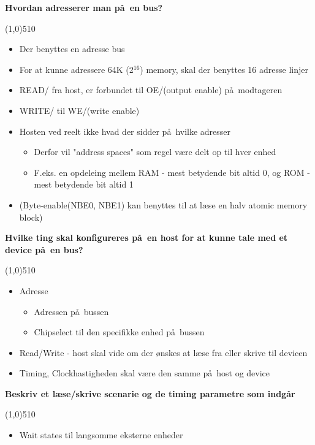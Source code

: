 \documentclass{paper}
\begin{document}
\begin{large}\textbf{Hvordan adresserer man p\aa\ en bus?}\end{large}

\line(1,0){510}
\begin{itemize}
	\item Der benyttes en adresse bus
	\item For at kunne adressere 64K (2$^{16}$) memory, skal der benyttes 16 adresse linjer  
	\item READ/ fra host, er forbundet til OE/(output enable) p\aa\ modtageren
	\item WRITE/ til WE/(write enable)
	\item Hosten ved reelt ikke hvad der sidder p\aa\ hvilke adresser
	\begin{itemize}
		\item Derfor vil "address spaces" som regel v\ae re delt op til hver enhed
		\item F.eks. en opdeleing mellem RAM - mest betydende bit altid 0, og ROM - mest betydende bit altid 1
	\end{itemize}
	\item (Byte-enable(NBE0, NBE1) kan benyttes til at l\ae se en halv atomic memory block) 
\end{itemize}

\begin{large}\textbf{Hvilke ting skal konfigureres p\aa\ en host for at kunne tale med et device p\aa\ en bus?}\end{large}

\line(1,0){510}
\begin{itemize}
	\item Adresse
	\begin{itemize}
		\item Adressen p\aa\ bussen
		\item Chipselect til den specifikke enhed p\aa\ bussen
	\end{itemize}
	\item Read/Write - host skal vide om der \o nskes at l\ae se fra eller skrive til devicen
	\item Timing, Clockhastigheden skal v\ae re den samme p\aa\ host og device
\end{itemize}

\begin{large}\textbf{Beskriv et l\ae se/skrive scenarie og de timing parametre som indg\aa r}\end{large}

\line(1,0){510}
\begin{itemize}
	\item Wait states til langsomme eksterne enheder
\end{itemize}
\end{document}
